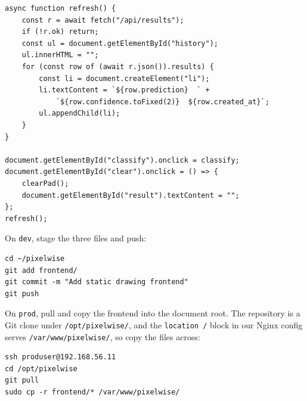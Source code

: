 \begin{verbatim}
async function refresh() {
    const r = await fetch("/api/results");
    if (!r.ok) return;
    const ul = document.getElementById("history");
    ul.innerHTML = "";
    for (const row of (await r.json()).results) {
        const li = document.createElement("li");
        li.textContent = `${row.prediction}  ` +
            `${row.confidence.toFixed(2)}  ${row.created_at}`;
        ul.appendChild(li);
    }
}

document.getElementById("classify").onclick = classify;
document.getElementById("clear").onclick = () => {
    clearPad();
    document.getElementById("result").textContent = "";
};
refresh();
\end{verbatim}



On \texttt{dev}, stage the three files and push:

\begin{verbatim}
cd ~/pixelwise
git add frontend/
git commit -m "Add static drawing frontend"
git push
\end{verbatim}

On \texttt{prod}, pull and copy the frontend into the document root.
The repository is a Git clone under \texttt{/opt/pixelwise/}, and the
\texttt{location /} block in our Nginx config serves
\texttt{/var/www/pixelwise/}, so copy the files across:

\begin{verbatim}
ssh produser@192.168.56.11
cd /opt/pixelwise
git pull
sudo cp -r frontend/* /var/www/pixelwise/
\end{verbatim}

